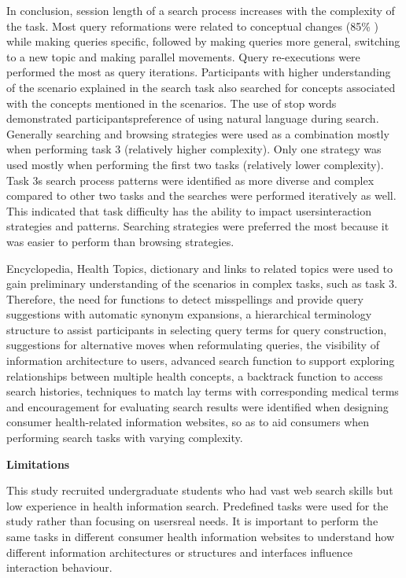 \documentclass[]{article}
\begin{document}
\begin{enumerate}
In conclusion, session length of a search process increases with the complexity of the task. Most query reformations were related to conceptual changes (85\% ) while making queries specific,  followed by making queries more general, switching to a new topic and making parallel movements. Query re-executions were performed the most as query iterations. Participants with higher understanding of the scenario explained in the search task also searched for concepts associated with the concepts mentioned in the scenarios. The use of stop words demonstrated participants\textquotesingle preference of using natural language during search. Generally searching and browsing strategies were used as a combination mostly when performing task 3 (relatively higher complexity). Only one strategy was used mostly when performing the first two tasks (relatively lower complexity). Task 3\textquotesingle s search process patterns were identified as more diverse and complex compared to other two tasks and the searches were performed iteratively as well. This indicated that task difficulty has the ability to impact users\textquotesingle interaction strategies and patterns. Searching strategies were preferred the most because it was easier to perform than browsing strategies. 

Encyclopedia, Health Topics, dictionary and links to related topics were used to gain preliminary understanding of the scenarios in complex tasks, such as task 3. Therefore, the need for functions to detect misspellings and provide query suggestions with automatic synonym expansions, a hierarchical terminology structure to assist participants in selecting query terms for query construction, suggestions for alternative moves when reformulating queries, the visibility of information architecture to users, advanced search function to support exploring relationships between multiple health concepts, a backtrack function to access search histories, techniques to match lay terms with corresponding medical terms and encouragement for evaluating search results were identified when designing consumer health-related information websites, so as to aid consumers when performing search tasks with varying complexity.         

\textbf{Limitations}

This study recruited undergraduate students who had vast web search skills but low experience in health information search. Predefined tasks were used for the study rather than focusing on users\textquotesingle real needs. It is important to perform the same tasks in different consumer health information websites to understand how different information architectures or structures and interfaces influence interaction behaviour. \\


\end{enumerate}
\end{document}
